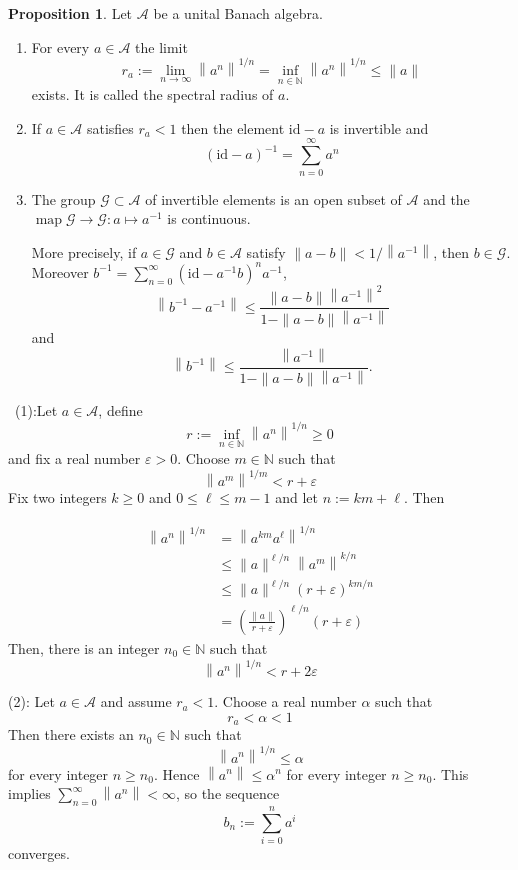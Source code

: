 \documentclass[12pt,a4paper]{book}
\newenvironment{prooff}{{\noindent\it\textcolor{cyan!40!black}{Proof}:}\,}{\par}
\newenvironment{enu}{\begin{enumerate}[(1)]}{\end{enumerate}}
\theoremstyle{definition}
\newtheorem{prop}[defn]{Proposition}
\begin{document}
\begin{prop}
    Let $\mathcal{A}$ be a unital Banach algebra.
\begin{enu} 
    \item For every $a \in \mathcal{A}$ the limit
    $$
    r_a:=\lim _{n \rightarrow \infty}\left\|a^n\right\|^{1 / n}=\inf _{n \in \mathbb{N}}\left\|a^n\right\|^{1 / n} \leq\|a\|
    $$
    exists. It is called the spectral radius of $a$.
    
    \item If $a \in \mathcal{A}$ satisfies $r_a<1$ then the element $\text{id}-a$ is invertible and
    $$
    (\text{id}-a)^{-1}=\sum_{n=0}^{\infty} a^n
    $$

    \item The group $\mathcal{G} \subset \mathcal{A}$ of invertible elements is an open subset of $\mathcal{A}$ and the $\operatorname{map} \mathcal{G} \rightarrow \mathcal{G}: a \mapsto a^{-1}$ is continuous. 

    More precisely, if $a \in \mathcal{G}$ and $b \in \mathcal{A}$ satisfy $\|a-b\|<1/\left\|a^{-1}\right\|$, 
    then $b \in \mathcal{G}$. Moreover $b^{-1}=\sum_{n=0}^{\infty}\left(\text{id}-a^{-1} b\right)^n a^{-1}$,
    $$
    \left\|b^{-1}-a^{-1}\right\| \leq \frac{\|a-b\|\left\|a^{-1}\right\|^2}{1-\|a-b\|\left\|a^{-1}\right\|} 
    $$
    and 
    $$
    \left\|b^{-1}\right\| \leq \frac{\left\|a^{-1}\right\|}{1-\|a-b\|\left\|a^{-1}\right\|}.
    $$
\end{enu}
\label{proposition: specturm radius}
\end{prop}
\begin{prooff}
    (1):Let $a \in \mathcal{A}$, define
    $$
    r:=\inf _{n \in \mathbb{N}}\left\|a^n\right\|^{1 / n} \geq 0
    $$
    and fix a real number $\varepsilon>0$. Choose $m \in \mathbb{N}$ such that
    $$
    \left\|a^m\right\|^{1 / m}<r+\varepsilon
    $$
    Fix two integers $k \geq 0$ and $0 \leq \ell \leq m-1$ and let $n:=k m+\ell$. Then
    
    $$
    \begin{aligned}
    \left\|a^n\right\|^{1 / n} & =\left\|a^{k m} a^{\ell}\right\|^{1 / n} \\
    & \leq\|a\|^{\ell / n}\left\|a^m\right\|^{k / n} \\
    & \leq\|a\|^{\ell / n}(r+\varepsilon)^{k m / n} \\
    & =\left(\frac{\|a\|}{r+\varepsilon}\right)^{\ell / n}(r+\varepsilon) 
    \end{aligned}
    $$
    Then, there is an integer $n_0 \in \mathbb{N}$ such that
    $$
    \left\|a^n\right\|^{1 / n}<r+2 \varepsilon
    $$

    (2): Let $a \in \mathcal{A}$ and assume $r_a<1$. Choose a real number $\alpha$ such that
    $$
    r_a<\alpha<1
    $$
    Then there exists an $n_0 \in \mathbb{N}$ such that
    $$
    \left\|a^n\right\|^{1 / n} \leq \alpha
    $$
    for every integer $n \geq n_0$. Hence $\left\|a^n\right\| \leq \alpha^n$ for every integer  $n \geq n_0$.
    This implies $\sum_{n=0}^{\infty}\left\|a^n\right\|<\infty$, so the sequence
    $$
    b_n:=\sum_{i=0}^n a^i
    $$
    converges.


\end{prooff}
\end{document}

